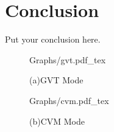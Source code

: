 \documentclass{article}
\begin{document}
%

%

\section{Conclusion}
\label{sec:conclusion}

Put your conclusion here.


\begin{figure}
\begin{minipage}[b]{0.48\linewidth}
    \centering
    \def\svgwidth{3.0cm}
    \fontsize{4}{15}\selectfont
     {Graphs/gvt.pdf_tex}
    \fontsize{8}{10}\selectfont
    \centerline{(a)GVT Mode }\medskip
\end{minipage}
\hfill
\begin{minipage}[b]{0.46\linewidth}
  \centering
  \def\svgwidth{4.60cm}
  \fontsize{4}{15}\selectfont
   {Graphs/cvm.pdf_tex}
  \fontsize{8}{10}\selectfont
  \centerline{(b)CVM Mode }\medskip
\end{minipage}
%
\caption{}
\label{fig:res}
%
\end{figure}
%



%
\end{document}
